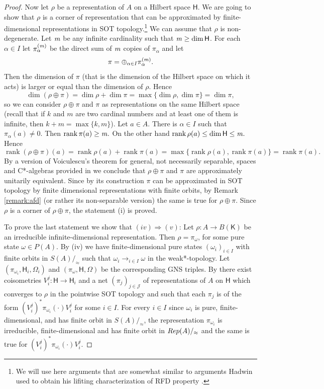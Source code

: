\documentclass[11 pt, leqno, hidelinks]{amsart}%
\theoremstyle{plain}
\numberwithin{equation}{section}
\newcommand{\Rep}{\textup{Rep}}
\newcommand{\rank}[0]{\operatorname{rank}}
\newcommand{\Hil}{\mathsf{H}}
\newcommand{\Kil}{\mathsf{K}}
\begin{document}
\begin{proof}
Now let $\rho$ be a representation of $A$ on a Hilbert space $\Hil$.  We are going to show that $\rho$ is a corner of representation that can be approximated by finite-dimensional representations in SOT topology.\footnote{We will use here arguments that are somewhat similar to arguments Hadwin used to obtain his lifiting characterization of RFD property \cite{Hadwin}.}  We can assume that $\rho$ is non-degenerate.  Let $\it m$ be any infinite cardinality such that $\it m \ge \dim \Hil$. For each $\alpha \in I$ let $\pi_{\alpha}^{(\it m)}$ be the direct sum of $\it m$ copies of $\pi_{\alpha}$ and let
$$\pi = \oplus_{\alpha\in I} \pi_{\alpha}^{(\it m)}.$$
Then the dimension of $\pi$ (that is the dimension of the Hilbert space on which it acts) is larger or equal than the dimension of $\rho$. Hence
$$\dim (\rho\oplus\pi)  = \dim \rho + \dim \pi = \max\{\dim \rho, \dim \pi\} = \dim \pi, $$
so we can consider $\rho\oplus\pi$ and $\pi$ as representations on the same Hilbert space (recall that if $k$ and $m$ are two cardinal numbers and at least one of them is infinite, then $k+m = \max\{k, m\}$).
Let $a\in A$. There is $\alpha\in I$ such that $\pi_{\alpha}(a)\neq 0$.  Then $\rank \pi(a) \ge \it m.$ On the other hand $\rank  \rho(a) \le \dim \Hil \le \it m.$ Hence
$$\rank (\rho \oplus \pi)(a) = \rank  \rho(a) + \rank  \pi(a) = \max\{\rank \rho(a), \rank \pi(a)\} = \rank  \pi(a).$$ By a version of Voiculescu's theorem for general, not necessarily separable, spaces and C*-algebras provided in \cite[Th. 3.14]{HadwinNonseparable} we conclude that $\rho\oplus \pi$ and $\pi$ are approximately unitarily equivalent. Since  by its construction  $\pi$ can be approximated in SOT topology by finite dimensional representations with finite orbits, by Remark \ref{remark:afd} (or rather its non-separable version) the same is true for  $\rho \oplus \pi$. Since $\rho$ is a corner of $\rho \oplus \pi$, the statement (i) is proved.


\medskip

To prove the last statement we show that $(iv)\Longrightarrow(v) $: Let $\rho: A \to B(\Kil)$ be an irreducible infinite-dimensional representation. Then $\rho = \pi_\omega$, for some pure state $\omega\in P(A)$. By (iv) we have finite-dimensional pure states  $(\omega_i)_{i \in I}$  with finite orbits in $S(A)/_{\approx}$
	such that  $\omega_i\longrightarrow_{i \in I} \omega$ in the weak*-topology.  Let $(\pi_{\omega_i}, \Hil_i, \Omega_i)$ and $(\pi_\omega, \Hil, \Omega)$ be the corresponding GNS triples.
	By \cite[proof of (a) $\Rightarrow$ (b) in Theorem 2.4]{ExelLoring} %
	there exist coisometries $V_i^j : \Hil \to \Hil_{i}$
	and a net $(\pi_j)_{j \in \mathcal J}$ of representations of $A$ on $\Hil$ which converges to $\rho$ in the pointwise  SOT topology and such that each $\pi_j$ is of the form  $(V_i^j)^* \pi_{\omega_i}(\cdot)V_i^j$ for some $i \in I$.
 For every $i \in I$ since  $\omega_i$ is pure, finite-dimensional, and has finite orbit in $S(A)/_{\approx}$, the representation $\pi_{\omega_i}$ is irreducible, finite-dimensional and has finite orbit in $\Rep(A)/_{\approx}$ and the same is true for $(V_i^j)^* \pi_{\omega_i}(\cdot)V_i^j$.
	

\end{proof}
\end{document}
